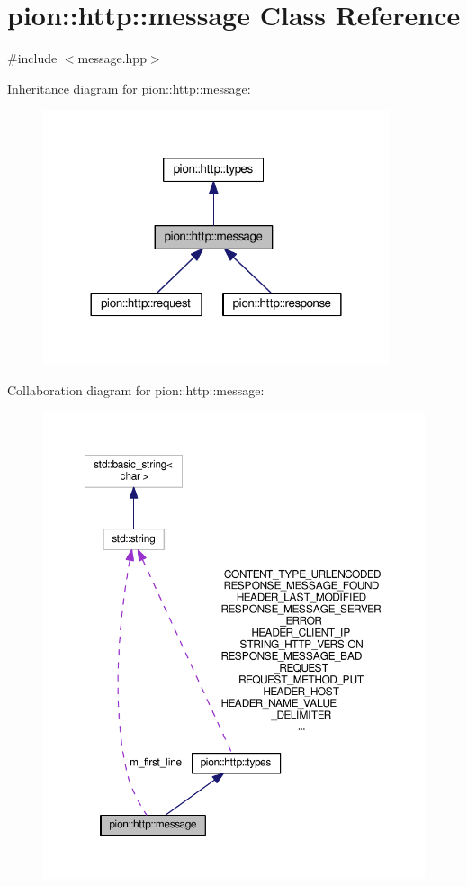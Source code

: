 \hypertarget{classpion_1_1http_1_1message}{\section{pion\-:\-:http\-:\-:message Class Reference}
\label{classpion_1_1http_1_1message}
}


{\ttfamily \#include $<$message.\-hpp$>$}



Inheritance diagram for pion\-:\-:http\-:\-:message\-:
\nopagebreak
\begin{figure}[H]
\begin{center}
\leavevmode
\includegraphics[width=288pt]{classpion_1_1http_1_1message__inherit__graph}
\end{center}
\end{figure}


Collaboration diagram for pion\-:\-:http\-:\-:message\-:
\nopagebreak
\begin{figure}[H]
\begin{center}
\leavevmode
\includegraphics[width=350pt]{classpion_1_1http_1_1message__coll__graph}
\end{center}
\end{figure}
